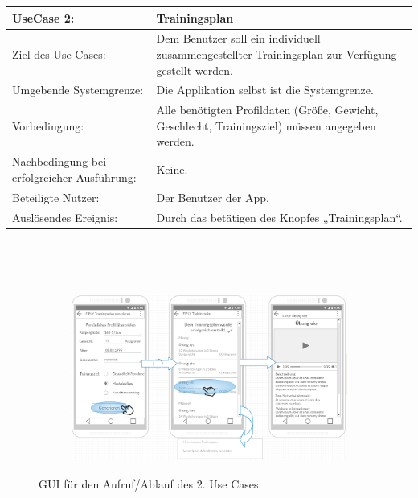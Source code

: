 \documentclass[FIPLY_base.tex]{subfiles}
\begin{document}
	\begin{center}
		\def\arraystretch{1.3}%
		\begin{tabular}{| p{5cm} | p{5cm} |}
			\hline
		    UseCase 2: & Trainingsplan
			\\ \hline 
			Ziel des Use Cases: & Dem Benutzer soll ein individuell zusammengestellter Trainingsplan zur Verfügung gestellt werden. 
			\\ \hline
			Umgebende Systemgrenze: & Die Applikation selbst ist die Systemgrenze. 
			\\ \hline
			Vorbedingung: & Alle benötigten Profildaten (Größe, Gewicht, Geschlecht, Trainingsziel) müssen angegeben werden.  
			\\ \hline
			Nachbedingung bei erfolgreicher Ausführung: & Keine.  
			\\ \hline
			Beteiligte Nutzer: & Der Benutzer der App. 
			\\ \hline
			Auslösendes Ereignis: & Durch das betätigen des Knopfes „Trainingsplan“. 
			\\ \hline
		\end{tabular} \\
	\end{center}
		\ \\
	\begin{figure}[H]
		\begin{subfigure}[b]{0.3\textwidth}
			\centering
			\includegraphics[scale=0.32]{img/Trainingsplangenerieren}
		\end{subfigure}
		\caption{GUI für den Aufruf/Ablauf des 2. Use Cases:}
	\end{figure}
		\ \\
\end{document}
